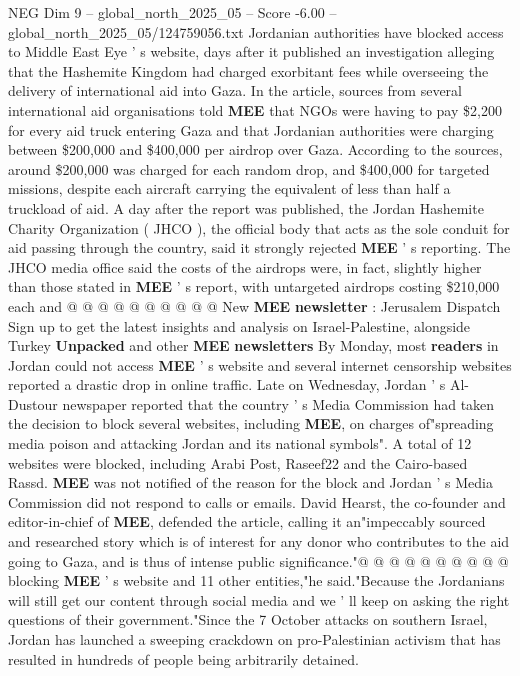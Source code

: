 \begin{textsample}{NEG Dim 9 – global\_north\_2025\_05 – Score -6.00 – global\_north\_2025\_05/124759056.txt}  \label{ex:f9_neg_086}
Jordanian authorities have blocked access to Middle East Eye ' s website, days after it published an investigation alleging that the Hashemite Kingdom had charged exorbitant fees while overseeing the delivery of international aid into Gaza.
In the article, sources from several international aid organisations told \textbf{MEE} that NGOs were having to pay \$2,200 for every aid truck entering Gaza and that Jordanian authorities were charging between \$200,000 and \$400,000 per airdrop over Gaza.
According to the sources, around \$200,000 was charged for each random drop, and \$400,000 for targeted missions, despite each aircraft carrying the equivalent of less than half a truckload of aid.
A day after the report was published, the Jordan Hashemite Charity Organization ( JHCO ), the official body that acts as the sole conduit for aid passing through the country, said it strongly rejected \textbf{MEE} ' s reporting.
The JHCO media office said the costs of the airdrops were, in fact, slightly higher than those stated in \textbf{MEE} ' s report, with untargeted airdrops costing \$210,000 each and @ @ @ @ @ @ @ @ @ @ New \textbf{MEE} \textbf{newsletter} : Jerusalem Dispatch Sign up to get the latest insights and analysis on Israel-Palestine, alongside Turkey \textbf{Unpacked} and other \textbf{MEE} \textbf{newsletters} By Monday, most \textbf{readers} in Jordan could not access \textbf{MEE} ' s website and several internet censorship websites reported a drastic drop in online traffic.
Late on Wednesday, Jordan ' s Al-Dustour newspaper reported that the country ' s Media Commission had taken the decision to block several websites, including \textbf{MEE}, on charges of"spreading media poison and attacking Jordan and its national symbols".
A total of 12 websites were blocked, including Arabi Post, Raseef22 and the Cairo-based Rassd. \textbf{MEE} was not notified of the reason for the block and Jordan ' s Media Commission did not respond to calls or emails.
David Hearst, the co-founder and editor-in-chief of \textbf{MEE}, defended the article, calling it an"impeccably sourced and researched story which is of interest for any donor who contributes to the aid going to Gaza, and is thus of intense public significance."@ @ @ @ @ @ @ @ @ @ blocking \textbf{MEE} ' s website and 11 other entities,"he said."Because the Jordanians will still get our content through social media and we ' ll keep on asking the right questions of their government."Since the 7 October attacks on southern Israel, Jordan has launched a sweeping crackdown on pro-Palestinian activism that has resulted in hundreds of people being arbitrarily detained.

\end{textsample}
